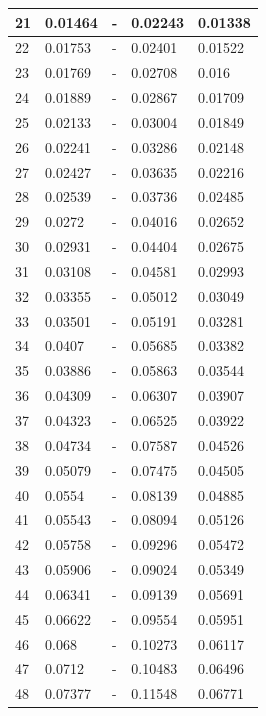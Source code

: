 \begin{table}[!ht]
\begin{tabular}{|l|l|l|l|l|}
        21 & 0.01464 & - & 0.02243 & 0.01338 \\ \hline
        22 & 0.01753 & - & 0.02401 & 0.01522 \\ \hline
        23 & 0.01769 & - & 0.02708 & 0.016 \\ \hline
        24 & 0.01889 & - & 0.02867 & 0.01709 \\ \hline
        25 & 0.02133 & - & 0.03004 & 0.01849 \\ \hline
        26 & 0.02241 & - & 0.03286 & 0.02148 \\ \hline
        27 & 0.02427 & - & 0.03635 & 0.02216 \\ \hline
        28 & 0.02539 & - & 0.03736 & 0.02485 \\ \hline
        29 & 0.0272 & - & 0.04016 & 0.02652 \\ \hline
        30 & 0.02931 & - & 0.04404 & 0.02675 \\ \hline
        31 & 0.03108 & - & 0.04581 & 0.02993 \\ \hline
        32 & 0.03355 & - & 0.05012 & 0.03049 \\ \hline
        33 & 0.03501 & - & 0.05191 & 0.03281 \\ \hline
        34 & 0.0407 & - & 0.05685 & 0.03382 \\ \hline
        35 & 0.03886 & - & 0.05863 & 0.03544 \\ \hline
        36 & 0.04309 & - & 0.06307 & 0.03907 \\ \hline
        37 & 0.04323 & - & 0.06525 & 0.03922 \\ \hline
        38 & 0.04734 & - & 0.07587 & 0.04526 \\ \hline
        39 & 0.05079 & - & 0.07475 & 0.04505 \\ \hline
        40 & 0.0554 & - & 0.08139 & 0.04885 \\ \hline
        41 & 0.05543 & - & 0.08094 & 0.05126 \\ \hline
        42 & 0.05758 & - & 0.09296 & 0.05472 \\ \hline
        43 & 0.05906 & - & 0.09024 & 0.05349 \\ \hline
        44 & 0.06341 & - & 0.09139 & 0.05691 \\ \hline
        45 & 0.06622 & - & 0.09554 & 0.05951 \\ \hline
        46 & 0.068 & - & 0.10273 & 0.06117 \\ \hline
        47 & 0.0712 & - & 0.10483 & 0.06496 \\ \hline
        48 & 0.07377 & - & 0.11548 & 0.06771 \\ \hline

\end{tabular}
\end{table}
